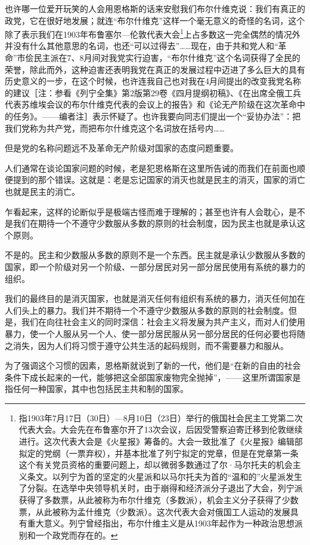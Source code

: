 \documentclass[UTF8, 12pt, a4paper]{ctexrep}
\begin{document}
也许哪一位爱开玩笑的人会用恩格斯的话来安慰我们布尔什维克说：我们有真正的政党，它在很好地发展；就连“布尔什维克”这样一个毫无意义的奇怪的名词，这个除了表示我们在1903年布鲁塞尔—伦敦代表大会\footnote{指1903年7月17日（30日）—8月10日（23日）举行的俄国社会民主工党第二次代表大会。大会先在布鲁塞尔开了13次会议，后因受警察迫寄迁移到伦敦继续进行。这次代表大会是《火星报》筹备的。大会一致批准了《火星报》编辑部拟定的党纲（一票弃权），并基本批准了列宁拟定的党章，但是在党章第一条这个有关党员资格的重要问题上，却以微弱多数通过了尔·马尔托夫的机会主义条文。以列宁为首的坚定的火星派和以马尔托夫为首的“温和的”火星派发生了分裂。在选举中央领导机关时，由于崩得和经济派分子退出了大会，列宁派获得了多数票，从此被称为布尔什维克（多数派），机会主义分子获得了少数票，从此被称为孟什维克（少数派）。这次代表大会对俄国工人运动的发展具有重大意义。列宁曾经指出，布尔什维主义是从1903年起作为一种政治思想派别和一个政党而存在的。}上占多数这一完全偶然的情况外并没有什么其他意思的名词，也还“可以过得去”……现在，由于共和党人和“革命”市侩民主派在7、8月间对我党实行迫害，“布尔什维克”这个名词获得了全民的荣誉，除此而外，这种迫害还表明我党在真正的发展过程中迈进了多么巨大的具有历史意义的一步，在这个时候，也许连我自己也对我在4月间提出的改变我党名称的建议［注：参看《列宁全集》第2版第29卷《四月提纲初稿》、《在出席全俄工兵代表苏维埃会议的布尔什维克代表的会议上的报告》和《论无产阶级在这次革命中的任务》。——编者注］表示怀疑了。也许我要向同志们提出一个“妥协办法”：把我们党称为共产党，而把布尔什维克这个名词放在括号内……

但是党的名称问题远不及革命无产阶级对国家的态度问题重要。

人们通常在谈论国家问题的时候，老是犯恩格斯在这里所告诫的而我们在前面也顺便提到的那个错误。这就是：老是忘记国家的消灭也就是民主的消灭，国家的消亡也就是民主的消亡。

乍看起来，这样的论断似乎是极端古怪而难于理解的；甚至也许有人会耽心，是不是我们在期待一个不遵守少数服从多数的原则的社会制度，因为民主也就是承认这个原则。

不是的。民主和少数服从多数的原则不是一个东西。民主就是承认少数服从多数的国家，即一个阶级对另一个阶级、一部分居民对另一部分居民使用有系统的暴力的组织。

我们的最终目的是消灭国家，也就是消灭任何有组织有系统的暴力，消灭任何加在人们头上的暴力。我们并不期待一个不遵守少数服从多数的原则的社会制度。但是，我们在向往社会主义的同时深信：社会主义将发展为共产主义，而对人们使用暴力，使一个人服从另一个人、使一部分居民服从另一部分居民的任何必要也将随之消失，因为人们将习惯于遵守公共生活的起码规则，而不需要暴力和服从。

为了强调这个习惯的因素，恩格斯就说到了新的一代，他们是“在新的自由的社会条件下成长起来的一代，能够把这全部国家废物完全抛掉”，——这里所谓国家是指任何一种国家，其中也包括民主共和制的国家。
\end{document}
